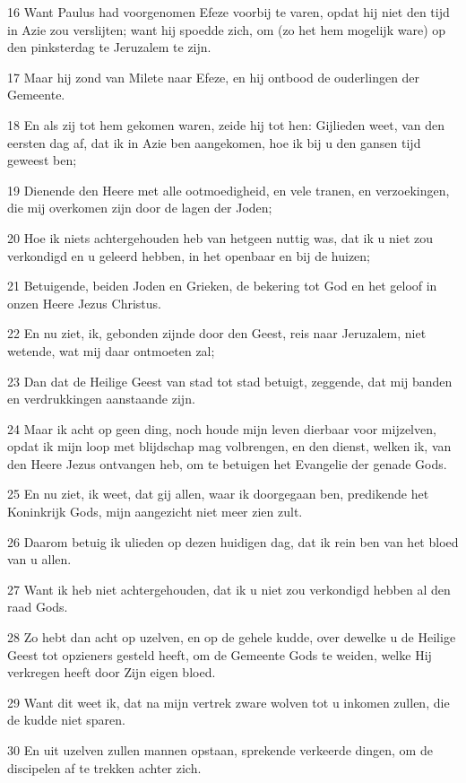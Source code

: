 \par 16 Want Paulus had voorgenomen Efeze voorbij te varen, opdat hij niet den tijd in Azie zou verslijten; want hij spoedde zich, om (zo het hem mogelijk ware) op den pinksterdag te Jeruzalem te zijn.
\par 17 Maar hij zond van Milete naar Efeze, en hij ontbood de ouderlingen der Gemeente.
\par 18 En als zij tot hem gekomen waren, zeide hij tot hen: Gijlieden weet, van den eersten dag af, dat ik in Azie ben aangekomen, hoe ik bij u den gansen tijd geweest ben;
\par 19 Dienende den Heere met alle ootmoedigheid, en vele tranen, en verzoekingen, die mij overkomen zijn door de lagen der Joden;
\par 20 Hoe ik niets achtergehouden heb van hetgeen nuttig was, dat ik u niet zou verkondigd en u geleerd hebben, in het openbaar en bij de huizen;
\par 21 Betuigende, beiden Joden en Grieken, de bekering tot God en het geloof in onzen Heere Jezus Christus.
\par 22 En nu ziet, ik, gebonden zijnde door den Geest, reis naar Jeruzalem, niet wetende, wat mij daar ontmoeten zal;
\par 23 Dan dat de Heilige Geest van stad tot stad betuigt, zeggende, dat mij banden en verdrukkingen aanstaande zijn.
\par 24 Maar ik acht op geen ding, noch houde mijn leven dierbaar voor mijzelven, opdat ik mijn loop met blijdschap mag volbrengen, en den dienst, welken ik, van den Heere Jezus ontvangen heb, om te betuigen het Evangelie der genade Gods.
\par 25 En nu ziet, ik weet, dat gij allen, waar ik doorgegaan ben, predikende het Koninkrijk Gods, mijn aangezicht niet meer zien zult.
\par 26 Daarom betuig ik ulieden op dezen huidigen dag, dat ik rein ben van het bloed van u allen.
\par 27 Want ik heb niet achtergehouden, dat ik u niet zou verkondigd hebben al den raad Gods.
\par 28 Zo hebt dan acht op uzelven, en op de gehele kudde, over dewelke u de Heilige Geest tot opzieners gesteld heeft, om de Gemeente Gods te weiden, welke Hij verkregen heeft door Zijn eigen bloed.
\par 29 Want dit weet ik, dat na mijn vertrek zware wolven tot u inkomen zullen, die de kudde niet sparen.
\par 30 En uit uzelven zullen mannen opstaan, sprekende verkeerde dingen, om de discipelen af te trekken achter zich.
